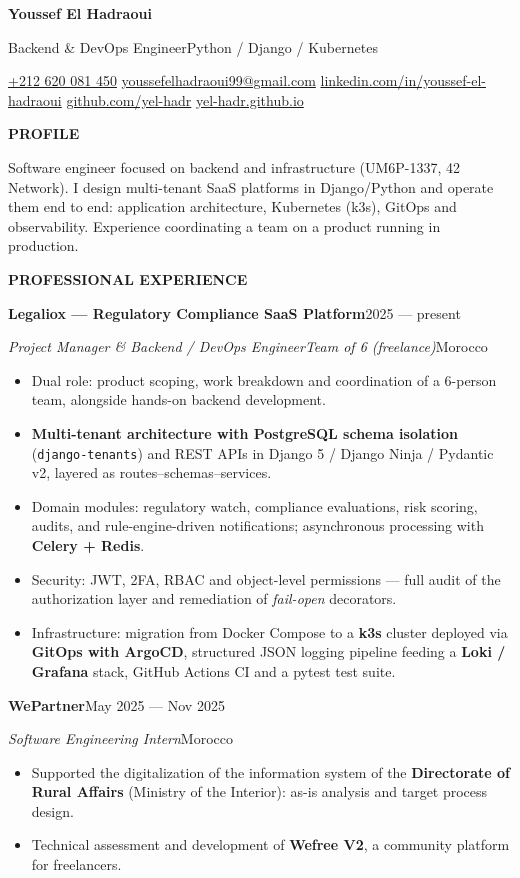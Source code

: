 \documentclass[10pt,a4paper]{article}
\makeatletter
\newcommand{\dotsep}{\enspace\textbullet\enspace}
\newcommand{\contactsep}{\enspace{\color{faint}\textbf{|}}\enspace}
\newcommand{\Header}[1]{%
  {\centering
    {\fontsize{24.8}{28}\selectfont\bfseries\color{accent}Youssef El Hadraoui}\par
    \vspace{4pt}
    {\sffamily\fontsize{8.25}{10}\selectfont\color{muted}#1}\par
    \vspace{9pt}
    {\footnotesize\color{muted}%
      \href{tel:+212620081450}{+212 620 081 450}\contactsep
      \href{mailto:youssefelhadraoui99@gmail.com}{youssefelhadraoui99@gmail.com}\contactsep
      \href{https://linkedin.com/in/youssef-el-hadraoui}{linkedin.com/in/youssef-el-hadraoui}\contactsep
      \href{https://github.com/yel-hadr}{github.com/yel-hadr}\contactsep
      \href{https://yel-hadr.github.io}{yel-hadr.github.io}}\par}
  \vspace{4pt}}
\newcommand{\Section}[1]{%
  \par\vspace{7pt}
  {\sffamily\bfseries\fontsize{7.33}{9}\selectfont\color{accent}\MakeUppercase{#1}}\par
  \vspace{1pt}{\color{faint}\hrule height 0.4pt}\vspace{5pt}}
\newcommand{\Entry}[4]{%
  \par\vspace{3pt}
  {\bfseries #1}\hfill{\small\color{muted}#2}\par
  \vspace{1pt}
  {\small\itshape\color{accent}#3}\hfill{\small\color{muted}#4}\par}
\makeatother
\begin{document}

\Header{Backend \& DevOps Engineer\dotsep Python / Django / Kubernetes}

\Section{Profile}
Software engineer focused on backend and infrastructure (UM6P-1337, 42 Network). I design multi-tenant
SaaS platforms in Django/Python and operate them end to end: application architecture, Kubernetes
(k3s), GitOps and observability. Experience coordinating a team on a product running in production.

\Section{Professional experience}
\Entry{Legaliox --- Regulatory Compliance SaaS Platform}{2025 --- present}
  {Project Manager \& Backend / DevOps Engineer\dotsep Team of 6 (freelance)}{Morocco}
\begin{itemize}
  \item Dual role: product scoping, work breakdown and coordination of a 6-person team, alongside
    hands-on backend development.
  \item \textbf{Multi-tenant architecture with PostgreSQL schema isolation} (\texttt{django-tenants})
    and REST APIs in Django 5 / Django Ninja / Pydantic v2, layered as routes--schemas--services.
  \item Domain modules: regulatory watch, compliance evaluations, risk scoring, audits, and
    rule-engine-driven notifications; asynchronous processing with \textbf{Celery + Redis}.
  \item Security: JWT, 2FA, RBAC and object-level permissions --- full audit of the authorization
    layer and remediation of \textit{fail-open} decorators.
  \item Infrastructure: migration from Docker Compose to a \textbf{k3s} cluster deployed via
    \textbf{GitOps with ArgoCD}, structured JSON logging pipeline feeding a \textbf{Loki / Grafana}
    stack, GitHub Actions CI and a pytest test suite.
\end{itemize}

\Entry{WePartner}{May 2025 --- Nov 2025}{Software Engineering Intern}{Morocco}
\begin{itemize}
  \item Supported the digitalization of the information system of the \textbf{Directorate of Rural
    Affairs} (Ministry of the Interior): as-is analysis and target process design.
  \item Technical assessment and development of \textbf{Wefree V2}, a community platform for
    freelancers.
\end{itemize}
\end{document}
